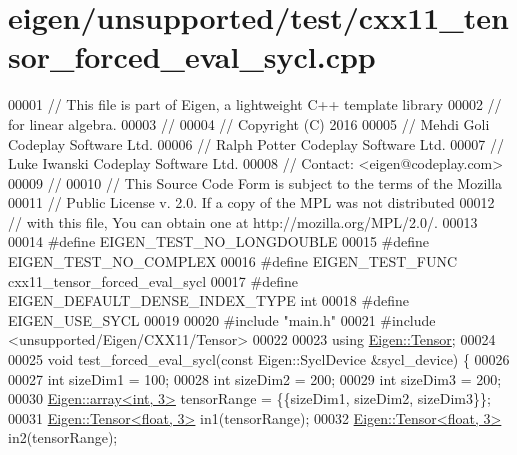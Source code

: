 \hypertarget{eigen_2unsupported_2test_2cxx11__tensor__forced__eval__sycl_8cpp_source}{}\section{eigen/unsupported/test/cxx11\+\_\+tensor\+\_\+forced\+\_\+eval\+\_\+sycl.cpp}
\label{eigen_2unsupported_2test_2cxx11__tensor__forced__eval__sycl_8cpp_source}

\begin{DoxyCode}
00001 \textcolor{comment}{// This file is part of Eigen, a lightweight C++ template library}
00002 \textcolor{comment}{// for linear algebra.}
00003 \textcolor{comment}{//}
00004 \textcolor{comment}{// Copyright (C) 2016}
00005 \textcolor{comment}{// Mehdi Goli    Codeplay Software Ltd.}
00006 \textcolor{comment}{// Ralph Potter  Codeplay Software Ltd.}
00007 \textcolor{comment}{// Luke Iwanski  Codeplay Software Ltd.}
00008 \textcolor{comment}{// Contact: <eigen@codeplay.com>}
00009 \textcolor{comment}{//}
00010 \textcolor{comment}{// This Source Code Form is subject to the terms of the Mozilla}
00011 \textcolor{comment}{// Public License v. 2.0. If a copy of the MPL was not distributed}
00012 \textcolor{comment}{// with this file, You can obtain one at http://mozilla.org/MPL/2.0/.}
00013 
00014 \textcolor{preprocessor}{#define EIGEN\_TEST\_NO\_LONGDOUBLE}
00015 \textcolor{preprocessor}{#define EIGEN\_TEST\_NO\_COMPLEX}
00016 \textcolor{preprocessor}{#define EIGEN\_TEST\_FUNC cxx11\_tensor\_forced\_eval\_sycl}
00017 \textcolor{preprocessor}{#define EIGEN\_DEFAULT\_DENSE\_INDEX\_TYPE int}
00018 \textcolor{preprocessor}{#define EIGEN\_USE\_SYCL}
00019 
00020 \textcolor{preprocessor}{#include "main.h"}
00021 \textcolor{preprocessor}{#include <unsupported/Eigen/CXX11/Tensor>}
00022 
00023 \textcolor{keyword}{using} \hyperlink{class_eigen_1_1_tensor}{Eigen::Tensor};
00024 
00025 \textcolor{keywordtype}{void} test\_forced\_eval\_sycl(\textcolor{keyword}{const} Eigen::SyclDevice &sycl\_device) \{
00026 
00027   \textcolor{keywordtype}{int} sizeDim1 = 100;
00028   \textcolor{keywordtype}{int} sizeDim2 = 200;
00029   \textcolor{keywordtype}{int} sizeDim3 = 200;
00030   \hyperlink{class_eigen_1_1array}{Eigen::array<int, 3>} tensorRange = \{\{sizeDim1, sizeDim2, sizeDim3\}\};
00031   \hyperlink{class_eigen_1_1_tensor}{Eigen::Tensor<float, 3>} in1(tensorRange);
00032   \hyperlink{class_eigen_1_1_tensor}{Eigen::Tensor<float, 3>} in2(tensorRange);

\end{DoxyCode}
